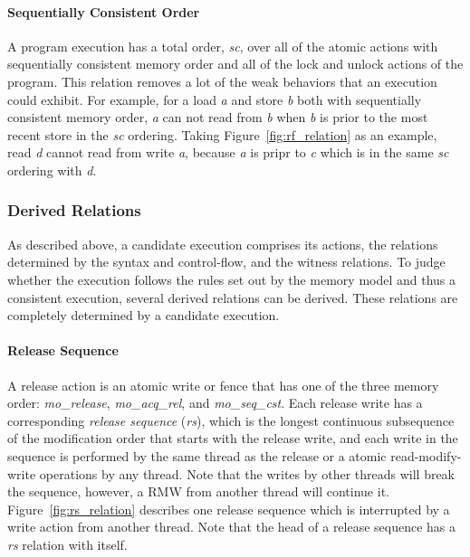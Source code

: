 \documentclass[preprint, numbers, 10pt]{sigplanconf}
\begin{document}
\paragraph{Sequentially Consistent Order}

A program execution has a total order, \textit{sc}, over all 
of the atomic actions with sequentially consistent memory order 
and all of the lock and unlock actions of the program. 
This relation removes a lot of the weak behaviors that 
an execution could exhibit. 
For example, for a load \textit{a} and store \textit{b} both with 
sequentially consistent memory order, \textit{a} can not read from
\textit{b} when \textit{b} is prior to the most recent store in 
the \textit{sc} ordering. Taking Figure~\ref{fig:rf_relation} as 
an example, read \textit{d} cannot read from write \textit{a}, because
\textit{a} is pripr to \textit{c} which is in the same \textit{sc} ordering with \textit{d}. 


\subsubsection{Derived Relations}
\label{sec:relation3}

As described above, a candidate execution comprises its actions,
the relations determined by the syntax and control-flow, and 
the witness relations. To judge whether the execution follows 
the rules set out by the memory model and thus a consistent 
execution, several derived relations can be derived. 
These relations are completely determined by a candidate execution.

\paragraph{Release Sequence}

A release action is an atomic write or fence that has one of the 
three memory order: \textit{mo\_release}, \textit{mo\_acq\_rel},
and \textit{mo\_seq\_cst}. Each release write has a corresponding 
\textit{release sequence} (\textit{rs}), which is the longest continuous 
subsequence of the modification order that starts with the release
write, and each write in the sequence is performed by the same thread 
as the release or a atomic read-modify-write operations by any thread.
Note that the writes by other threads will break the sequence, however,
a RMW from another thread will continue it. Figure~\ref{fig:rs_relation}
describes one release sequence which is interrupted by a write action
from another thread. Note that the head of a release sequence has a 
\textit{rs} relation with itself.
\end{document}
